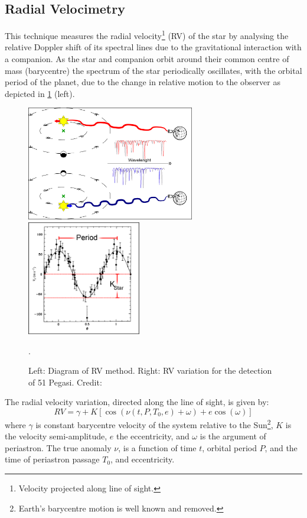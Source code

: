 \subsection{Radial Velocimetry}
\label{subsec:radial_velocimetry}
This technique measures the radial velocity\footnote{Velocity projected along line of sight.} (RV) of the star by analysing the relative Doppler shift of its spectral lines due to the gravitational interaction with a companion.
As the star and companion orbit around their common centre of mass (barycentre) the spectrum of the star periodically oscillates, with the orbital period of the planet, due to the change in relative motion to the observer as depicted in \cref{fig:rvdiagram-mayor} (left).

\begin{figure}
    \centering
    \includegraphics[height=5cm]{./figures/introduction/RV_Diagram}
    \includegraphics[height=5cm]{./figures/introduction/PhaseFolded_51Pegb_Mayor_et_al_1995}
    \caption[The {RV} method.]{Left: Diagram of {RV} method.
    Right: {RV} variation for the detection of {51 Pegasi}.
    Credit:~\citet{mayor_jupitermass_1995}}.
    \label{fig:rvdiagram-mayor}
\end{figure}

The radial velocity variation, directed along the line of sight, is given by:
\begin{equation}
\label{eqn:rv_equation_intro}
{RV} = \gamma + K [\cos{(\nu(t, P, T_0, e) + \omega)} + e\cos{(\omega)}]
\end{equation}
where \(\gamma\) is constant barycentre velocity of the system relative to the Sun\footnote{Earth's barycentre motion is well known and removed.}, \(K\) is the velocity semi-amplitude, \(e\) the eccentricity, and \(\omega\) is the argument of periastron.
The true anomaly \(\nu\), is a function of time \(t\), orbital period \(P\), and the time of periastron passage \(T_0\), and eccentricity.

